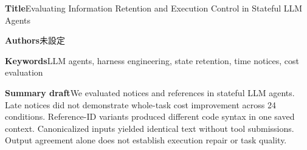 \documentclass[uplatex,a4paper,twocolumn,10pt]{jsarticle}
\begin{document}
\clearpage
\onecolumn
\noindent\textbf{Title}\quad Evaluating Information Retention and Execution Control in Stateful LLM Agents

\noindent\textbf{Authors}\quad 未設定

\noindent\textbf{Keywords}\quad LLM agents, harness engineering, state retention, time notices, cost evaluation

\noindent\textbf{Summary draft}\quad We evaluated notices and references in stateful LLM agents. Late notices did not demonstrate whole-task cost improvement across 24 conditions. Reference-ID variants produced different code syntax in one saved context. Canonicalized inputs yielded identical text without tool submissions. Output agreement alone does not establish execution repair or task quality.
\end{document}
